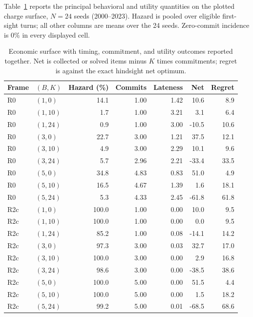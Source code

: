 \documentclass{article}
\begin{document}
Table~\ref{tab:econ-full} reports the principal behavioral and utility
quantities on the plotted charge surface, $N=24$ seeds (2000--2023). Hazard is pooled over eligible
first-sight turns; all other columns are means over the 24 seeds. Zero-commit
incidence is 0\% in every displayed cell.

\begin{table}[H]
\centering
\scriptsize
\caption{Economic surface with timing, commitment, and utility outcomes reported
together. Net is collected or solved items minus $K$ times commitments; regret
is against the exact hindsight net optimum.}
\label{tab:econ-full}
\begin{tabular}{llrrrrr}
\hline
Frame & $(B,K)$ & Hazard (\%) & Commits & Lateness & Net & Regret \\
\hline
R0 & $(1,0)$  & 14.1 & 1.00 & 1.42 & 10.6 & 8.9 \\
R0 & $(1,10)$ & 1.7  & 1.00 & 3.21 & 3.1 & 6.4 \\
R0 & $(1,24)$ & 0.9  & 1.00 & 3.00 & -10.5 & 10.6 \\
R0 & $(3,0)$  & 22.7 & 3.00 & 1.21 & 37.5 & 12.1 \\
R0 & $(3,10)$ & 4.9  & 3.00 & 2.29 & 10.1 & 9.6 \\
R0 & $(3,24)$ & 5.7  & 2.96 & 2.21 & -33.4 & 33.5 \\
R0 & $(5,0)$  & 34.8 & 4.83 & 0.83 & 51.0 & 4.9 \\
R0 & $(5,10)$ & 16.5 & 4.67 & 1.39 & 1.6 & 18.1 \\
R0 & $(5,24)$ & 5.3  & 4.33 & 2.45 & -61.8 & 61.8 \\
\hline
R2c & $(1,0)$  & 100.0 & 1.00 & 0.00 & 10.0 & 9.5 \\
R2c & $(1,10)$ & 100.0 & 1.00 & 0.00 & 0.0 & 9.5 \\
R2c & $(1,24)$ & 85.2 & 1.00 & 0.08 & -14.1 & 14.2 \\
R2c & $(3,0)$  & 97.3 & 3.00 & 0.03 & 32.7 & 17.0 \\
R2c & $(3,10)$ & 100.0 & 3.00 & 0.00 & 2.9 & 16.8 \\
R2c & $(3,24)$ & 98.6 & 3.00 & 0.00 & -38.5 & 38.6 \\
R2c & $(5,0)$  & 100.0 & 5.00 & 0.00 & 51.5 & 4.4 \\
R2c & $(5,10)$ & 100.0 & 5.00 & 0.00 & 1.5 & 18.2 \\
R2c & $(5,24)$ & 99.2 & 5.00 & 0.01 & -68.5 & 68.6 \\
\hline
\end{tabular}
\end{table}
\end{document}
